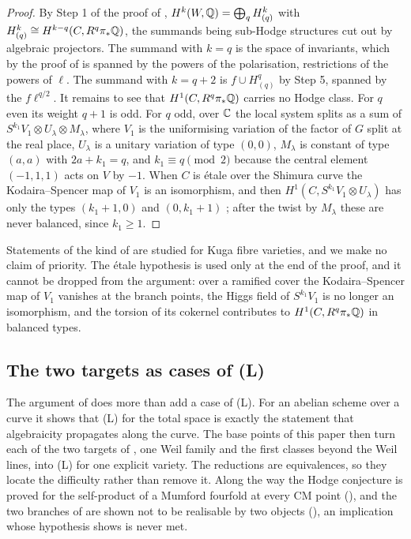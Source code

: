 \begin{proof}
By Step 1 of the proof of ,
$H^{k}(W,\mathbb{Q})=\bigoplus_{q}H^{k}_{(q)}$ with $H^{k}_{(q)}\cong
H^{k-q}(C,R^{q}\pi_{*}\mathbb{Q})$, the summands being sub-Hodge structures cut out by
algebraic projectors. The summand with $k=q$ is the space of invariants, which
by the proof of  is spanned by the powers of the
polarisation, restrictions of the powers of $\ell$. The summand with $k=q+2$
is $f\cup H^{q}_{(q)}$ by Step 5, spanned by the $f\ell^{q/2}$. It remains to
see that $H^{1}(C,R^{q}\pi_{*}\mathbb{Q})$ carries no Hodge class. For $q$ even its
weight $q+1$ is odd. For $q$ odd, over $\mathbb{C}$ the local system splits as a sum
of $S^{k_{1}}V_{1}\otimes U_{\lambda}\otimes M_{\lambda}$, where $V_{1}$ is the
uniformising variation of the factor of $G$ split at the real place, $U_{\lambda}$ is
a unitary variation of type $(0,0)$, $M_{\lambda}$ is constant of type $(a,a)$
with $2a+k_{1}=q$, and $k_{1}\equiv q\pmod2$ because the central element
$(-1,1,1)$ acts on $V$ by $-1$. When $C$ is \'etale over the Shimura curve the
Kodaira--Spencer map of $V_{1}$ is an isomorphism, and then
$H^{1}(C,S^{k_{1}}V_{1}\otimes U_{\lambda})$ has only the types $(k_{1}+1,0)$
and $(0,k_{1}+1)$ \cite{Zuc79}; after the twist by $M_{\lambda}$ these are
never balanced, since $k_{1}\ge1$.
\end{proof}

Statements of the kind of  are studied for Kuga
fibre varieties, and we make no claim of priority.
The \'etale hypothesis is used only at the end of the proof, and it cannot be
dropped from the argument: over a ramified cover the Kodaira--Spencer map of
$V_{1}$ vanishes at the branch points, the Higgs field of $S^{k_{1}}V_{1}$ is
no longer an isomorphism, and the torsion of its cokernel contributes to
$H^{1}(C,R^{q}\pi_{*}\mathbb{Q})$ in balanced types.

\subsection{The two targets as cases of (L)}
\label{ssec:targets}

The argument of  does more than add a case of
\textup{(L)}. For an abelian scheme over a curve it shows that \textup{(L)}
for the total space is exactly the statement that algebraicity propagates
along the curve. The base points of this paper then turn each of the two
targets of , one Weil family and the first
classes beyond the Weil lines, into \textup{(L)} for one explicit variety. The
reductions are equivalences, so they locate the difficulty rather than remove
it. Along the way the Hodge conjecture is proved for the self-product of a
Mumford fourfold at every CM point (), and the two
branches of  are shown not to be realisable by two
objects (), an implication whose hypothesis
 shows is never met.

